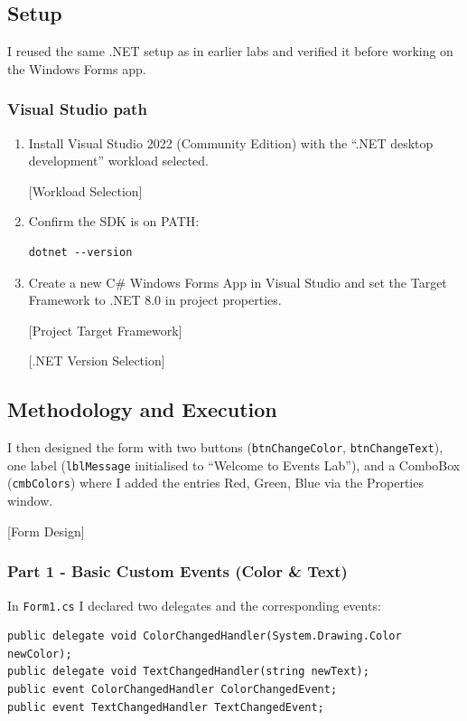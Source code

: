 \subsection{Setup}
I reused the same .NET setup as in earlier labs and verified it before working on the Windows Forms app.

\subsubsection*{Visual Studio path}
\begin{enumerate}
	\item Install Visual Studio 2022 (Community Edition) with the ``.NET desktop development'' workload selected.

	[Workload Selection]

	\item Confirm the SDK is on PATH:
\begin{verbatim}
dotnet --version
\end{verbatim}
	\item Create a new C\# Windows Forms App in Visual Studio and set the Target Framework to .NET 8.0 in project properties.

	[Project Target Framework]

	[.NET Version Selection]
\end{enumerate}


\subsection{Methodology and Execution}

I then designed the form with two buttons (\texttt{btnChangeColor}, \texttt{btnChangeText}), one label (\texttt{lblMessage} initialised to ``Welcome to Events Lab''), and a ComboBox (\texttt{cmbColors}) where I added the entries Red, Green, Blue via the Properties window.

[Form Design]

\subsubsection{Part 1 - Basic Custom Events (Color \& Text)}
In \texttt{Form1.cs} I declared two delegates and the corresponding events:
\begin{lstlisting}
public delegate void ColorChangedHandler(System.Drawing.Color newColor);
public delegate void TextChangedHandler(string newText);
public event ColorChangedHandler ColorChangedEvent;
public event TextChangedHandler TextChangedEvent;
\end{lstlisting}

